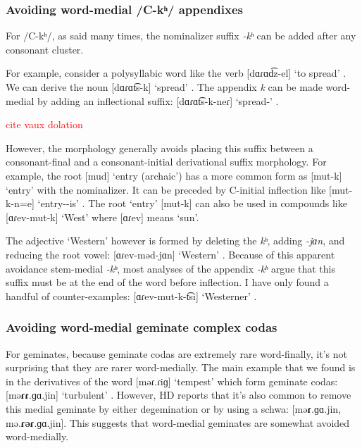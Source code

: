 	\subsubsection{Avoiding word-medial /C-kʰ/ appendixes }\label{section:syllable:OtherCodaRestrictions:AvoidMedial:Ck}
	
	
	For /C-kʰ/, as said many times, the nominalizer suffix \textit{-kʰ} can be added after any consonant cluster. 
	
	For example, consider a polysyllabic word like    the verb [dɑɾɑd͡z-el] `to spread' . We can derive the noun [dɑɾɑt͡s-k] `spread' . The appendix \textit{k} can be made word-medial by adding an inflectional suffix: [dɑɾɑt͡s-k-neɾ] `spread-{\pl}' . 
	
	\textcolor{red}{cite vaux dolation}
	
	However, the morphology generally avoids placing this suffix between a consonant-final and a consonant-initial derivational suffix morphology. For example, the root [mud] `entry (archaic')  has a more common form as [mut-k] `entry'  with the nominalizer.  It can be preceded by C-initial inflection like [mut-k-n=e] `entry-{}-is' .   The root `entry' [mut-k] can also be used in compounds like [ɑɾev-mut-k] `West'   where [ɑɾev] means `sun'. 
	
	The adjective `Western' however is formed by deleting the \textit{kʰ}, adding \textit{-jɑn}, and reducing the root vowel: [ɑɾev-məd-jɑn] `Western' .  Because of this apparent avoidance stem-medial \textit{-kʰ}, most analyses of the appendix \textit{-kʰ} argue that this suffix must be at the end of the word before inflection. I have only found a handful of counter-examples: [ɑɾev-mut-k-t͡si]  `Westerner' . 
	
	\subsubsection{Avoiding word-medial geminate complex codas}\label{section:syllable:OtherCodaRestrictions:AvoidMedial:Gemin}
	
	For geminates, because geminate codas are extremely rare word-finally, it's not surprising that they are rarer word-medially. The main example that we found is in the derivatives of the word [məɾ.ɾiɡ] `tempest'  which form geminate codas: [mə\textbf{ɾɾ}.ɡɑ.jin] `turbulent' . However, HD reports that it's also common to remove this medial geminate by either degemination  or by using a schwa: [mə\textbf{ɾ}.ɡɑ.jin, mə.\textbf{ɾəɾ}.ɡɑ.jin]. This suggests that word-medial geminates are somewhat avoided word-medially. 
	
